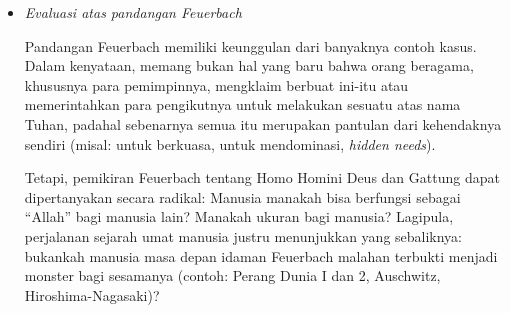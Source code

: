 \documentclass[10pt,a4paper]{article}
\begin{document}
\begin{multicols}{2}
\begin{itemize}
  Pada dasarnya Marx setuju atas pandangan Feuerbach bahwa manusia
  mengasingkan diri dalam agama. Persoalan Tuhan sudah diatasi Feuerbach
  dengan semboyannya ``homo homini Deus.'' Namun demikian, Marx
  berpendapat bahwa Feuerbach masih terlalu abstrak Manusia yang
  dipersoalkan Feuerbach yaitu Gattung--adalah suatu entitas yang sama
  sekali tidak konkret. Menurut Marx, itu hanyalah mengganti nama pada
  entitas yang sama: dari yang semula bernama ``Tuhan,'' Feuerbach
  menggantikannya dengan nama ``Gattung.'' Itulah sebabnya, Marx
  menyebut Feuerbach sebagai seorang ``ateis saleh.'' Marx lalu menuntut
  supaya manusia dipandang sebagai sebuah realitas konkret. Pertanyaan
  mendasar yang diajukan Marx adalah mengapa manusia mengasingkan
  dirinya dalam agama?

  Untuk menjawab pertanyaan ini, perlu diingat kembali sistem filsafat
  Marx yang dikenal dengan nama ``materialisme sejarah.'' Dalam sistem
  tersebut, Marx membagi realitas masyarakat ke dalam dua bagian: (1)
  basis atau suprastruktur, yaitu kegiatan ekonomi; serta (2) bangunan
  atas atau superstruktur, yaitu hukum, politik, ideologi, filsafat,
  seni, agama. Menurut Marx, basis menentukan bangunan atas. Atas dasar
  sistem ini, maka Marx memandang agama sebagai sebuah gejala sosial
  dengan sifat-sifat berikut: Di satu sisi, agama merupakan tanda adanya
  ketidakberesan sosial di tengah masyarakat. Di sisi lain, agama
  meninabobokkan masyarakat sehingga mereka lari dari masalah sosial
  yang mereka miliki.
\item
  \emph{Evaluasi atas pandangan Feuerbach}

  Pandangan Feuerbach memiliki keunggulan dari banyaknya contoh kasus.
  Dalam kenyataan, memang bukan hal yang baru bahwa orang beragama,
  khususnya para pemimpinnya, mengklaim berbuat ini-itu atau
  memerintahkan para pengikutnya untuk melakukan sesuatu atas nama
  Tuhan, padahal sebenarnya semua itu merupakan pantulan dari
  kehendaknya sendiri (misal: untuk berkuasa, untuk mendominasi,
  \emph{hidden needs}).

  Tetapi, pemikiran Feuerbach tentang Homo Homini Deus dan Gattung dapat
  dipertanyakan secara radikal: Manusia manakah bisa berfungsi sebagai
  ``Allah'' bagi manusia lain? Manakah ukuran bagi manusia? Lagipula,
  perjalanan sejarah umat manusia justru menunjukkan yang sebaliknya:
  bukankah manusia masa depan idaman Feuerbach malahan terbukti menjadi
  monster bagi sesamanya (contoh: Perang Dunia I dan 2, Auschwitz,
  Hiroshima-Nagasaki)?


\end{itemize}
\end{multicols}
\end{document}
